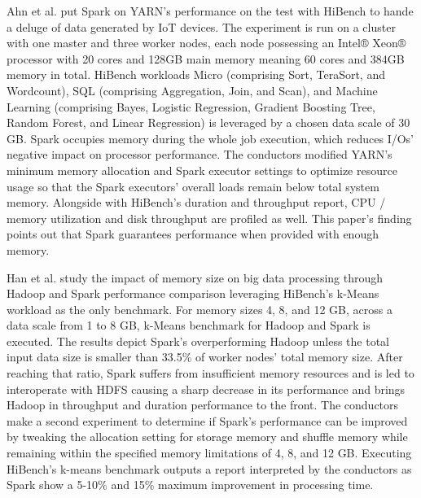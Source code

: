 \documentclass[review]{elsarticle}
\begin{document}
	Ahn et al. \cite{ahn_performance_2018} put Spark on YARN's performance on the test with HiBench to hande a deluge of data generated by IoT devices. The experiment is run on a cluster with one master and three worker nodes, each node possessing an Intel® Xeon® processor with 20 cores and 128GB main memory meaning 60 cores and 384GB memory in total. HiBench workloads Micro (comprising Sort, TeraSort, and Wordcount), SQL (comprising Aggregation, Join, and Scan), and Machine Learning (comprising Bayes, Logistic Regression, Gradient Boosting Tree, Random Forest, and Linear Regression) is leveraged by a chosen data scale of 30 GB. Spark occupies memory during the whole job execution, which reduces I/Os' negative impact on processor performance. The conductors modified YARN's minimum memory allocation and Spark executor settings to optimize resource usage so that the Spark executors' overall loads remain below total system memory. Alongside with HiBench's duration and throughput report, CPU / memory utilization and disk throughput are profiled as well. This paper's finding points out that Spark guarantees performance when provided with enough memory.
	
	Han et al. \cite{han_impact_2017} study the impact of memory size on big data processing through Hadoop and Spark performance comparison leveraging HiBench's k-Means workload as the only benchmark. For memory sizes 4, 8, and 12 GB, across a data scale from 1 to 8 GB, k-Means benchmark for Hadoop and Spark is executed. The results depict Spark's overperforming Hadoop unless the total input data size is smaller than 33.5\% of worker nodes' total memory size. After reaching that ratio, Spark suffers from insufficient memory resources and is led to interoperate with HDFS causing a sharp decrease in its performance and brings Hadoop in throughput and duration performance to the front. The conductors make a second experiment to determine if Spark's performance can be improved by tweaking the allocation setting for storage memory and shuffle memory while remaining within the specified memory limitations of 4, 8, and 12 GB. Executing HiBench's k-means benchmark outputs a report interpreted by the conductors as Spark show a 5-10\% and 15\% maximum improvement in processing time.
	
\end{document}
